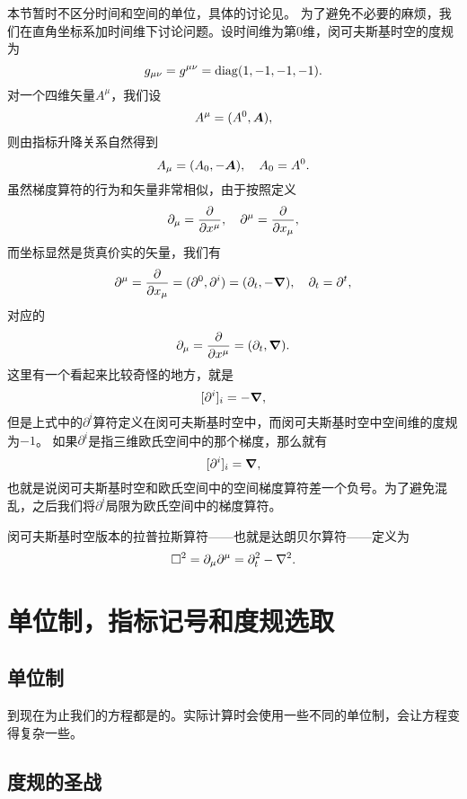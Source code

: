 本节暂时不区分时间和空间的单位，具体的讨论见。
为了避免不必要的麻烦，我们在直角坐标系加时间维下讨论问题。设时间维为第$0$维，闵可夫斯基时空的度规为
\begin{equation}
    g_{\mu \nu} = g^{\mu \nu} = \operatorname{diag}(1, -1, -1, -1).
\end{equation}
对一个四维矢量$A^\mu$，我们设
\begin{equation}
    A^\mu = (A^0, \vb*{A}),
\end{equation}
则由指标升降关系自然得到
\begin{equation}
    A_\mu = (A_0, -\vb*{A}), \quad A_0 = A^0.
\end{equation}
虽然梯度算符的行为和矢量非常相似，由于按照定义
\[
    \partial_\mu = \pdv{x^\mu}, \quad \partial^\mu = \pdv{x_\mu},
\]
而坐标显然是货真价实的矢量，我们有
\begin{equation}
    \partial^\mu = \pdv{x_\mu} = (\partial^0, \partial^i) = (\partial_t, - \grad), \quad \partial_t = \partial^t,
\end{equation}
对应的
\begin{equation}
    \partial_\mu = \pdv{x^\mu} = (\partial_t, \grad).
\end{equation}
这里有一个看起来比较奇怪的地方，就是
\[
    [\partial^i]_i = - \grad,
\]
但是上式中的$\partial^i$算符定义在闵可夫斯基时空中，而闵可夫斯基时空中空间维的度规为$-1$。
如果$\partial^i$是指三维欧氏空间中的那个梯度，那么就有
\[
    [\partial^i]_i = \grad,
\]
也就是说闵可夫斯基时空和欧氏空间中的空间梯度算符差一个负号。为了避免混乱，之后我们将$\partial^i$局限为欧氏空间中的梯度算符。

闵可夫斯基时空版本的拉普拉斯算符——也就是达朗贝尔算符——定义为
\begin{equation}
    \Box^2 = \partial_\mu \partial^\mu = \partial_t^2 - \laplacian.
\end{equation}

\section{单位制，指标记号和度规选取}

\subsection{单位制}\label{sec:unit-system}

到现在为止我们的方程都是的。实际计算时会使用一些不同的单位制，会让方程变得复杂一些。

\subsection{度规的圣战}

